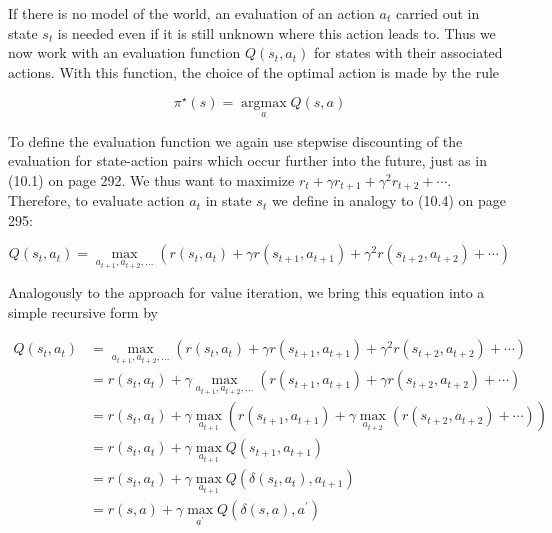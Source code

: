 \documentclass[10pt]{article}
\begin{document}
If there is no model of the world, an evaluation of an action $a_{t}$ carried out in state $s_{t}$ is needed even if it is still unknown where this action leads to. Thus we now work with an evaluation function $Q\left(s_{t}, a_{t}\right)$ for states with their associated actions. With this function, the choice of the optimal action is made by the rule


\begin{equation*}
\pi^{\star}(s)=\underset{a}{\operatorname{argmax}} Q(s, a) \tag{10.9}
\end{equation*}


To define the evaluation function we again use stepwise discounting of the evaluation for state-action pairs which occur further into the future, just as in (10.1) on page 292. We thus want to maximize $r_{t}+\gamma r_{t+1}+\gamma^{2} r_{t+2}+\cdots$. Therefore, to evaluate action $a_{t}$ in state $s_{t}$ we define in analogy to (10.4) on page 295:


\begin{equation*}
Q\left(s_{t}, a_{t}\right)=\max _{a_{t+1}, a_{t+2}, \ldots}\left(r\left(s_{t}, a_{t}\right)+\gamma r\left(s_{t+1}, a_{t+1}\right)+\gamma^{2} r\left(s_{t+2}, a_{t+2}\right)+\cdots\right) \tag{10.10}
\end{equation*}


Analogously to the approach for value iteration, we bring this equation into a simple recursive form by


\begin{align*}
Q\left(s_{t}, a_{t}\right) & =\max _{a_{t+1}, a_{t+2}, \ldots}\left(r\left(s_{t}, a_{t}\right)+\gamma r\left(s_{t+1}, a_{t+1}\right)+\gamma^{2} r\left(s_{t+2}, a_{t+2}\right)+\cdots\right) \\
& =r\left(s_{t}, a_{t}\right)+\gamma \max _{a_{t+1}, a_{t+2}, \ldots}\left(r\left(s_{t+1}, a_{t+1}\right)+\gamma r\left(s_{t+2}, a_{t+2}\right)+\cdots\right) \\
& =r\left(s_{t}, a_{t}\right)+\gamma \max _{a_{t+1}}\left(r\left(s_{t+1}, a_{t+1}\right)+\gamma \max _{a_{t+2}}\left(r\left(s_{t+2}, a_{t+2}\right)+\cdots\right)\right) \\
& =r\left(s_{t}, a_{t}\right)+\gamma \max _{a_{t+1}} Q\left(s_{t+1}, a_{t+1}\right) \\
& =r\left(s_{t}, a_{t}\right)+\gamma \max _{a_{t+1}} Q\left(\delta\left(s_{t}, a_{t}\right), a_{t+1}\right) \\
& =r(s, a)+\gamma \max _{a^{\prime}} Q\left(\delta(s, a), a^{\prime}\right) \tag{10.11}
\end{align*}
\end{document}
